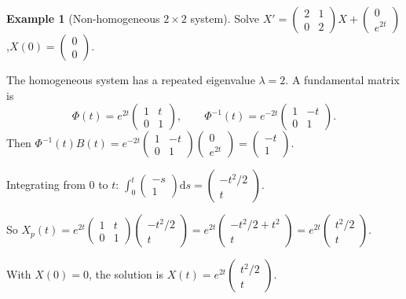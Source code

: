 \documentclass[12pt,a4paper,openany]{book}
\theoremstyle{definition}
\newtheorem{example}[definition]{Example}
\theoremstyle{plain}
\theoremstyle{remark}
\newcommand{\dd}{\mathrm{d}}
\begin{document}
\begin{example}[Non-homogeneous $2\times 2$ system]\label{ex:nonhom-sys}
Solve $X' = \begin{pmatrix}2&1\\0&2\end{pmatrix}X
+ \begin{pmatrix}0\\e^{2t}\end{pmatrix}$,\quad $X(0)=\begin{pmatrix}0\\0\end{pmatrix}$.

The homogeneous system has a repeated eigenvalue $\lambda=2$.
A fundamental matrix is
\[
  \Phi(t) = e^{2t}\begin{pmatrix}1&t\\0&1\end{pmatrix},
  \qquad
  \Phi^{-1}(t) = e^{-2t}\begin{pmatrix}1&-t\\0&1\end{pmatrix}.
\]
Then $\Phi^{-1}(t)B(t) = e^{-2t}\begin{pmatrix}1&-t\\0&1\end{pmatrix}
\begin{pmatrix}0\\e^{2t}\end{pmatrix}
= \begin{pmatrix}-t\\1\end{pmatrix}$.

Integrating from $0$ to $t$:
$\int_0^t \begin{pmatrix}-s\\1\end{pmatrix}\dd s
= \begin{pmatrix}-t^2/2\\t\end{pmatrix}$.

So $X_p(t) = e^{2t}\begin{pmatrix}1&t\\0&1\end{pmatrix}
\begin{pmatrix}-t^2/2\\t\end{pmatrix}
= e^{2t}\begin{pmatrix}-t^2/2+t^2\\t\end{pmatrix}
= e^{2t}\begin{pmatrix}t^2/2\\t\end{pmatrix}$.

With $X(0)=0$, the solution is
$X(t) = e^{2t}\begin{pmatrix}t^2/2\\t\end{pmatrix}$.
\end{example}
\end{document}
